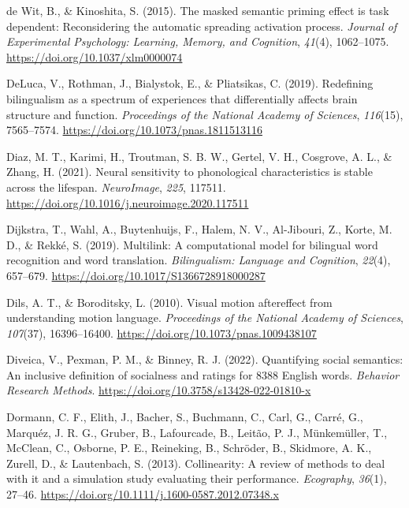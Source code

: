 \documentclass[
  12pt,
  man,floatsintext]{apa7}
\newlength{\cslhangindent}
\newlength{\cslentryspacingunit} %
\newenvironment{CSLReferences}[2] %
 {%
  \setlength{\parindent}{0pt}
  \ifodd #1
  \let\oldpar\par
  \def\par{\hangindent=\cslhangindent\oldpar}
  \fi
  \setlength{\parskip}{#2\cslentryspacingunit}
 }%
 {}
\begin{document}
\begin{CSLReferences}{1}{0}
\leavevmode{}%
de Wit, B., \& Kinoshita, S. (2015). The masked semantic priming effect is task dependent: {Reconsidering} the automatic spreading activation process. \emph{Journal of Experimental Psychology: Learning, Memory, and Cognition}, \emph{41}(4), 1062--1075. \url{https://doi.org/10.1037/xlm0000074}

\leavevmode{}%
DeLuca, V., Rothman, J., Bialystok, E., \& Pliatsikas, C. (2019). Redefining bilingualism as a spectrum of experiences that differentially affects brain structure and function. \emph{Proceedings of the National Academy of Sciences}, \emph{116}(15), 7565--7574. \url{https://doi.org/10.1073/pnas.1811513116}

\leavevmode{}%
Diaz, M. T., Karimi, H., Troutman, S. B. W., Gertel, V. H., Cosgrove, A. L., \& Zhang, H. (2021). Neural sensitivity to phonological characteristics is stable across the lifespan. \emph{NeuroImage}, \emph{225}, 117511. \url{https://doi.org/10.1016/j.neuroimage.2020.117511}

\leavevmode{}%
Dijkstra, T., Wahl, A., Buytenhuijs, F., Halem, N. V., Al-Jibouri, Z., Korte, M. D., \& Rekké, S. (2019). Multilink: {A} computational model for bilingual word recognition and word translation. \emph{Bilingualism: Language and Cognition}, \emph{22}(4), 657--679. \url{https://doi.org/10.1017/S1366728918000287}

\leavevmode{}%
Dils, A. T., \& Boroditsky, L. (2010). Visual motion aftereffect from understanding motion language. \emph{Proceedings of the National Academy of Sciences}, \emph{107}(37), 16396--16400. \url{https://doi.org/10.1073/pnas.1009438107}

\leavevmode{}%
Diveica, V., Pexman, P. M., \& Binney, R. J. (2022). Quantifying social semantics: {An} inclusive definition of socialness and ratings for 8388 {English} words. \emph{Behavior Research Methods}. \url{https://doi.org/10.3758/s13428-022-01810-x}

\leavevmode{}%
Dormann, C. F., Elith, J., Bacher, S., Buchmann, C., Carl, G., Carré, G., Marquéz, J. R. G., Gruber, B., Lafourcade, B., Leitão, P. J., Münkemüller, T., McClean, C., Osborne, P. E., Reineking, B., Schröder, B., Skidmore, A. K., Zurell, D., \& Lautenbach, S. (2013). Collinearity: A review of methods to deal with it and a simulation study evaluating their performance. \emph{Ecography}, \emph{36}(1), 27--46. \url{https://doi.org/10.1111/j.1600-0587.2012.07348.x}


\end{CSLReferences}
\end{document}

